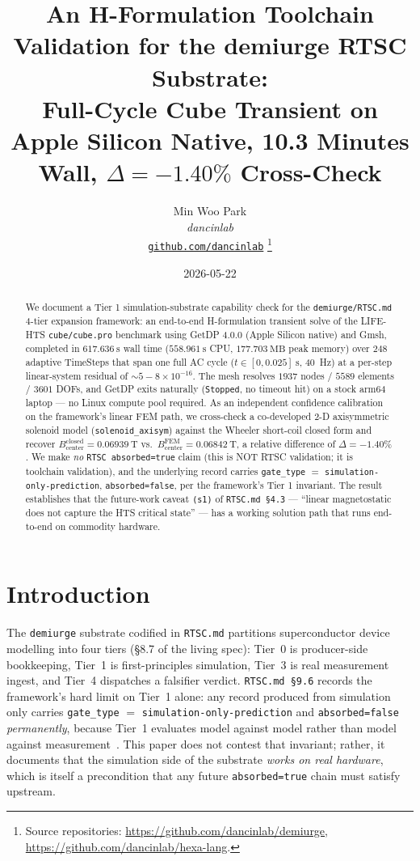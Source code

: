 \documentclass[11pt,a4paper]{article}
\title{
  \textbf{An H-Formulation Toolchain Validation for the demiurge RTSC Substrate:}\\[4pt]
  Full-Cycle Cube Transient on Apple Silicon Native, 10.3 Minutes Wall, $\Delta = -1.40\%$ Cross-Check
}
\author{
  Min Woo Park\\
  \normalsize\textit{dancinlab}\\[2pt]
  \normalsize\href{https://github.com/dancinlab}{\texttt{github.com/dancinlab}}
  \thanks{Source repositories:
    \url{https://github.com/dancinlab/demiurge},
    \url{https://github.com/dancinlab/hexa-lang}.}
}
\date{2026-05-22}
\newcommand{\absorbedtrue}{\textcolor{honestgreen}{\texttt{absorbed=true}}}
\newcommand{\absorbedfalse}{\textcolor{honestred}{\texttt{absorbed=false}}}
\newcommand{\simonly}{\texttt{simulation-only-prediction}}
\begin{document}
\maketitle

\begin{abstract}
We document a Tier 1 simulation-substrate capability check for the
\texttt{demiurge/RTSC.md} 4-tier expansion framework: an end-to-end
H-formulation transient solve of the LIFE-HTS \texttt{cube/cube.pro}
benchmark using GetDP 4.0.0 (Apple Silicon native) and Gmsh, completed
in $617.636~\mathrm{s}$ wall time ($558.961~\mathrm{s}$ CPU,
$177.703~\mathrm{MB}$ peak memory) over $248$ adaptive TimeSteps that
span one full AC cycle ($t \in [0, 0.025]~\mathrm{s}$, 40~Hz) at a
per-step linear-system residual of $\sim 5{-}8 \times 10^{-16}$.
The mesh resolves $1937$ nodes / $5589$ elements / $3601$ DOFs, and
GetDP exits naturally (\texttt{Stopped}, no timeout hit) on a stock
arm64 laptop --- no Linux compute pool required. As an
independent confidence calibration on the framework's linear FEM
path, we cross-check a co-developed 2-D axisymmetric solenoid model
(\texttt{solenoid\_axisym}) against the Wheeler short-coil closed
form and recover $B_{\mathrm{center}}^{\mathrm{closed}} =
0.06939~\mathrm{T}$ vs.\ $B_{\mathrm{center}}^{\mathrm{FEM}} =
0.06842~\mathrm{T}$, a relative difference of $\Delta = -1.40\%$.
We make \emph{no} \texttt{RTSC absorbed=true} claim (this is NOT RTSC
validation; it is toolchain validation), and the underlying record
carries \texttt{gate\_type} $=$ \simonly, \absorbedfalse{}, per
the framework's Tier 1 invariant. The result establishes that the future-work
caveat \texttt{(s1)} of \texttt{RTSC.md \S4.3} --- ``linear
magnetostatic does not capture the HTS critical state'' --- has a
working solution path that runs end-to-end on commodity hardware.
\end{abstract}

\section{Introduction}
\label{sec:intro}

The \texttt{demiurge} substrate codified in \texttt{RTSC.md} partitions
superconductor device modelling into four tiers
(\S8.7 of the living spec): Tier~0 is producer-side bookkeeping, Tier~1
is first-principles simulation, Tier~3 is real measurement ingest, and
Tier~4 dispatches a falsifier verdict. \texttt{RTSC.md \S9.6} records
the framework's hard limit on Tier~1 alone: any record produced from
simulation only carries \texttt{gate\_type} $=$ \simonly{} and
\absorbedfalse{} \emph{permanently}, because Tier~1 evaluates model
against model rather than model against measurement~\cite{rtsc_md}.
This paper does not contest that invariant; rather, it documents that
the simulation side of the substrate \emph{works on real hardware},
which is itself a precondition that any future \absorbedtrue{} chain
must satisfy upstream.
\end{document}
